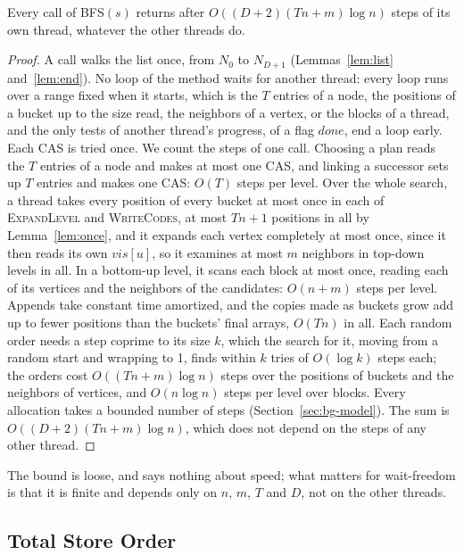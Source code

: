 \begin{theorem}
\label{thm:waitfree}
Every call of \textsc{BFS}$(s)$ returns after $O((D+2)(Tn + m) \log n)$ steps of its own thread, whatever the other threads do.
\end{theorem}
\begin{proof}
A call walks the list once, from $N_0$ to $N_{D+1}$ (Lemmas~\ref{lem:list} and~\ref{lem:end}). No loop of the method waits for another thread: every loop runs over a range fixed when it starts, which is the $T$ entries of a node, the positions of a bucket up to the size read, the neighbors of a vertex, or the blocks of a thread, and the only tests of another thread's progress, of a flag $\mathit{done}$, end a loop early. Each CAS is tried once. We count the steps of one call. Choosing a plan reads the $T$ entries of a node and makes at most one CAS, and linking a successor sets up $T$ entries and makes one CAS: $O(T)$ steps per level. Over the whole search, a thread takes every position of every bucket at most once in each of \textsc{ExpandLevel} and \textsc{WriteCodes}, at most $Tn + 1$ positions in all by Lemma~\ref{lem:once}, and it expands each vertex completely at most once, since it then reads its own $\mathit{vis}[u]$, so it examines at most $m$ neighbors in top-down levels in all. In a bottom-up level, it scans each block at most once, reading each of its vertices and the neighbors of the candidates: $O(n + m)$ steps per level. Appends take constant time amortized, and the copies made as buckets grow add up to fewer positions than the buckets' final arrays, $O(Tn)$ in all. Each random order needs a step coprime to its size $k$, which the search for it, moving from a random start and wrapping to 1, finds within $k$ tries of $O(\log k)$ steps each; the orders cost $O((Tn + m) \log n)$ steps over the positions of buckets and the neighbors of vertices, and $O(n \log n)$ steps per level over blocks. Every allocation takes a bounded number of steps (Section~\ref{sec:bg-model}). The sum is $O((D+2)(Tn + m) \log n)$, which does not depend on the steps of any other thread.
\end{proof}

The bound is loose, and says nothing about speed; what matters for wait-freedom is that it is finite and depends only on $n$, $m$, $T$ and $D$, not on the other threads.

\subsection{Total Store Order}
\label{sec:pf-tso}

